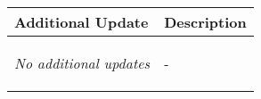 \begin{table}[!h]
    \centering
    \begin{tabularx}{\textwidth}{|l|X|}
        \hline
        Additional Update & Description \\
        \hline
        \hline
        \textit{No additional updates} & 
        \begin{myitemize}
            \item -
        \end{myitemize} \\
        \hline
    \end{tabularx}
\end{table}
